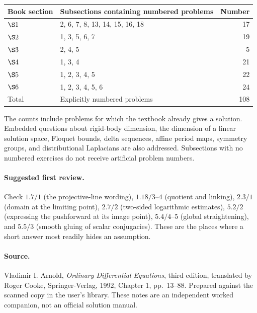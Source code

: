 \documentclass[11pt]{article}
\begin{document}
\begin{center}\begin{tabular}{llr}\toprule
Book section & Subsections containing numbered problems & Number\\\midrule
$\S1$ & 2, 6, 7, 8, 13, 14, 15, 16, 18 & 17\\
$\S2$ & 1, 3, 5, 6, 7 & 19\\
$\S3$ & 2, 4, 5 & 5\\
$\S4$ & 1, 3, 4 & 21\\
$\S5$ & 1, 2, 3, 4, 5 & 22\\
$\S6$ & 1, 2, 3, 4, 5, 6 & 24\\\midrule
Total & Explicitly numbered problems & 108\\\bottomrule
\end{tabular}\end{center}
The counts include problems for which the textbook already gives a solution. Embedded questions about rigid-body dimension, the dimension of a linear solution space, Floquet bounds, delta sequences, affine period maps, symmetry groups, and distributional Laplacians are also addressed. Subsections with no numbered exercises do not receive artificial problem numbers.

\paragraph{Suggested first review.}
Check $1.7/1$ (the projective-line wording), $1.18/3$--$4$ (quotient and linking), $2.3/1$ (domain at the limiting point), $2.7/2$ (two-sided logarithmic estimates), $5.2/2$ (expressing the pushforward at its image point), $5.4/4$--$5$ (global straightening), and $5.5/3$ (smooth gluing of scalar conjugacies). These are the places where a short answer most readily hides an assumption.

\paragraph{Source.}
Vladimir I. Arnold, \emph{Ordinary Differential Equations}, third edition, translated by Roger Cooke, Springer-Verlag, 1992, Chapter 1, pp.~13--88. Prepared against the scanned copy in the user's library. These notes are an independent worked companion, not an official solution manual.
\end{document}
